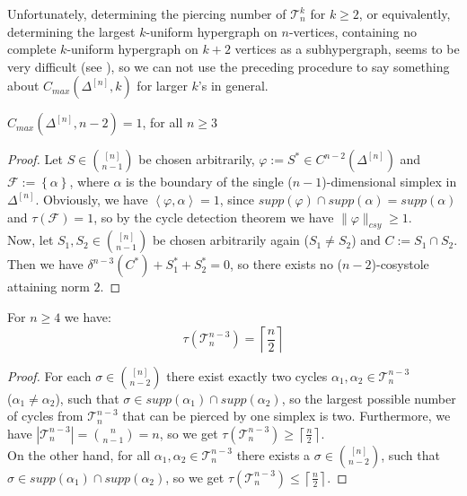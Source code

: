 Unfortunately, determining the piercing number of \(\mathcal{T}_n^k\) for \(k\geq 2\), or equivalently, determining the largest \(k\)-uniform hypergraph on \(n\)-vertices, containing no complete \(k\)-uniform hypergraph on \(k+2\) vertices as a subhypergraph, seems to be very difficult (see \cite{7}), so we can not use the preceding procedure to say something about \(C_{max}(\Delta^{[n]},k)\) for larger \(k\)'s in general.

\begin{thm}\label{theorem7}
\(C_{max}(\Delta^{[n]},n-2)=1\), for all \(n\geq 3\)
\begin{proof}
Let \(S\in\binom{[n]}{n-1}\) be chosen arbitrarily, \(\varphi:=S^*\in C^{n-2}(\Delta^{[n]})\) and\\
\(\mathcal{F}:=\left\{\alpha\right\}\), where \(\alpha\) is the boundary of the single (\(n-1\))-dimensional simplex in \(\Delta^{[n]}\). Obviously, we have \(\left\langle\varphi,\alpha\right\rangle=1\), since \(supp(\varphi)\cap supp(\alpha)=supp(\alpha)\) and \(\tau(\mathcal{F})=1\), so by the cycle detection theorem we have \(\|\varphi\|_{csy}\geq 1\).\\
Now, let \(S_1,S_2\in\binom{[n]}{n-1}\) be chosen arbitrarily again (\(S_1\neq S_2\)) and \(C:=S_1\cap S_2\). Then we have \(\delta^{n-3}(C^*)+S_1^*+S_2^*=0\), so there exists no (\(n-2\))-cosystole attaining norm \(2\).
\end{proof}
\end{thm}

\begin{lem}\label{lemma12}
For \(n\geq 4\) we have:
\[
\tau(\mathcal{T}_n^{n-3})=\left\lceil\frac{n}{2}\right\rceil
\]
\begin{proof}
For each \(\sigma\in\binom{[n]}{n-2}\) there exist exactly two cycles \(\alpha_1,\alpha_2\in\mathcal{T}_n^{n-3}\)\\
(\(\alpha_1\neq\alpha_2\)), such that \(\sigma\in supp(\alpha_1)\cap supp(\alpha_2)\), so the largest possible number of cycles from \(\mathcal{T}_n^{n-3}\) that can be pierced by one simplex is two. Furthermore, we have \(\left|\mathcal{T}_n^{n-3}\right|=\binom{n}{n-1}=n\), so we get \(\tau(\mathcal{T}_n^{n-3})\geq\left\lceil\frac{n}{2}\right\rceil\).\\
On the other hand, for all \(\alpha_1,\alpha_2\in\mathcal{T}_n^{n-3}\) there exists a \(\sigma\in\binom{[n]}{n-2}\), such that \(\sigma\in supp(\alpha_1)\cap supp(\alpha_2)\), so we get \(\tau(\mathcal{T}_n^{n-3})\leq\left\lceil\frac{n}{2}\right\rceil\).
\end{proof}
\end{lem}


